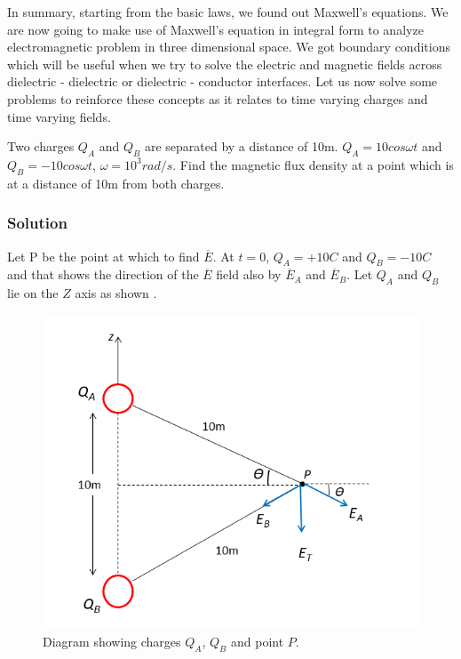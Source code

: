 In summary, starting from the basic laws, we found out Maxwell's equations. We are now going to make use of Maxwell's equation in integral form to analyze electromagnetic problem in three dimensional space. We got boundary conditions which will be useful when we try to solve the electric and magnetic fields across dielectric - dielectric or dielectric - conductor interfaces. Let us now solve some problems to reinforce these concepts as it relates to time varying charges and time varying fields.
\begin{exmp}
Two charges $Q_A$ and $Q_B$ are separated by a distance of 10m. $Q_A = 10cos\omega t$ and $Q_B = -10cos\omega t$, $\omega = 10^3 rad/s$. Find the magnetic flux density at a point which is at a distance of 10m from both charges.

\subsubsection*{Solution}
Let P be the point at which to find $\overline{E}$. At $t = 0$, $Q_A = +10C$ and $Q_B = -10C$ and that shows the direction of the $\overline{E}$ field also by $\overline{E}_{A}$ and $\overline{E}_{B}$. Let $Q_A$ and $Q_B$ lie on the $Z$ axis as shown .
\begin{figure}[h]
\centering
\includegraphics[width=1\linewidth]{./graphics/fig20.10}
\caption{Diagram showing charges $Q_A$, $Q_B$ and point $P$.}
\end{figure}


\end{exmp}
